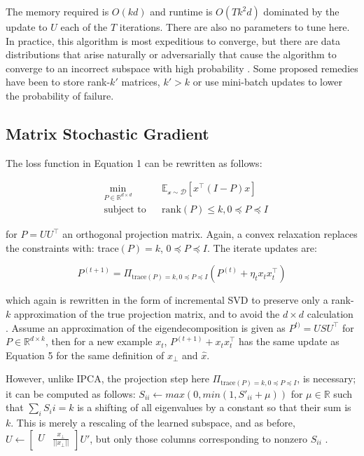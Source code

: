\documentclass[11pt,letterpaper]{article}
\begin{document}
The memory required is $O(kd)$ and runtime is $O(Tk^2d)$ dominated by the update to $U$ each of the $T$ iterations. There are also no parameters to tune here. In practice, this algorithm is most expeditious to converge, but there are data distributions that arise naturally or adversarially that cause the algorithm to converge to an incorrect subspace with high probability \cite{arora1}. Some proposed remedies have been to store rank-$k'$ matrices, $k' > k$ or use mini-batch updates to lower the probability of failure. 


\subsection{Matrix Stochastic Gradient}

The loss function in Equation 1 can be rewritten as follows:

\begin{equation}
\begin{aligned}
& \underset{P \in \mathbb{R}^{d \times d}}{\text{min}}
& & \mathbb{E}_{\mathcal{x \sim D}}\left[ x^{\top}(I - P)x\right] \\
& \text{subject to}
& & \text{rank}(P)\leq k, 0 \preceq P \preceq I
\end{aligned}
\end{equation}

for $P = UU^{\top}$ an orthogonal projection matrix. Again, a convex relaxation replaces the constraints with: trace$(P) = k$, $0 \preceq P \preceq I$. The iterate updates are:

\begin{equation}
P^{(t + 1)} = \Pi_{\text{trace}(P) = k, 0 \preceq P \preceq I} \left(P^{(t)} + \eta_tx_tx_t^{\top}\right)
\end{equation}

which again is rewritten in the form of incremental SVD to preserve only a rank-$k$ approximation of the true projection matrix, and to avoid the $d \times d$ calculation \cite{Arora2}. Assume an approximation of the eigendecomposition is given as $P^{t)} = USU^{\top}$ for $P \in \mathbb{R}^{d \times k}$, then for a new example $x_t$, $P^{(t+1)} + x_tx_t^{\top}$ has the same update as Equation 5 for the same definition of $x_{\perp}$ and $\hat{x}$. 

However, unlike IPCA, the projection step here $ \Pi_{\text{trace}(P) = k, 0 \preceq P \preceq I}$, is necessary; it can be computed as follows: $S_{ii} \gets max(0, min(1, S'_{ii} + \mu))$ for $\mu \in \mathbb{R}$ such that $\sum_i S_ii = k$ is a shifting of all eigenvalues by a constant so that their sum is $k$. This is merely a rescaling of the learned subspace, and as before, $U \gets \begin{bmatrix} U & \frac{x_{\perp}}{||x_{\perp}||} \end{bmatrix} U'$, but only those columns corresponding to nonzero $S_{ii}$ \cite{Arora2}.
\end{document}
